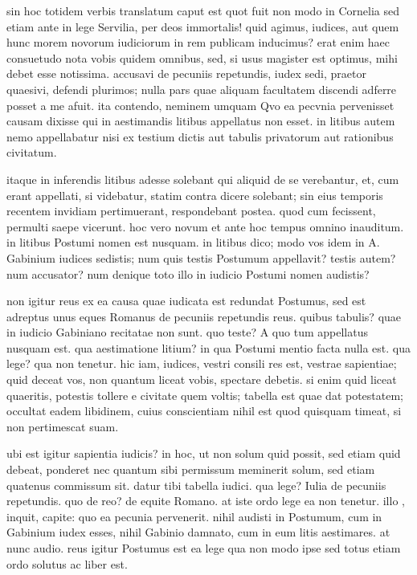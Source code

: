  sin hoc totidem verbis translatum caput est quot fuit non modo in Cornelia sed etiam ante in lege Servilia, per deos immortalis! quid agimus, iudices, aut quem hunc morem novorum iudiciorum in rem publicam inducimus? erat enim haec consuetudo nota vobis quidem omnibus, sed, si usus magister est optimus, mihi debet esse notissima. accusavi de pecuniis repetundis, iudex sedi, praetor quaesivi, defendi plurimos; nulla pars quae aliquam facultatem discendi adferre posset a me afuit. ita contendo, neminem umquam Qvo ea pecvnia pervenisset causam dixisse qui in aestimandis litibus appellatus non esset. in litibus autem nemo appellabatur nisi ex testium dictis aut tabulis privatorum aut rationibus civitatum.

 itaque in inferendis litibus adesse solebant qui aliquid de se verebantur, et, cum erant appellati, si videbatur, statim contra dicere solebant; sin eius temporis recentem invidiam pertimuerant, respondebant postea. quod cum fecissent, permulti saepe vicerunt. hoc vero novum et ante hoc tempus omnino inauditum. in litibus Postumi nomen est nusquam. in litibus dico; modo vos idem in A. Gabinium iudices sedistis; num quis testis Postumum appellavit? testis autem? num accusator? num denique toto illo in iudicio Postumi nomen audistis?

 non igitur reus ex ea causa quae iudicata est redundat Postumus, sed est adreptus unus eques Romanus de pecuniis repetundis reus. quibus tabulis? quae in iudicio Gabiniano recitatae non sunt. quo teste? A quo tum appellatus nusquam est. qua aestimatione litium? in qua Postumi mentio facta nulla est. qua lege? qua non tenetur. hic iam, iudices, vestri consili res est, vestrae sapientiae; quid deceat vos, non quantum liceat vobis, spectare debetis. si enim quid liceat quaeritis, potestis tollere e civitate quem voltis; tabella est quae dat potestatem; occultat eadem libidinem, cuius conscientiam nihil est quod quisquam timeat, si non pertimescat suam.

 ubi est igitur sapientia iudicis? in hoc, ut non solum quid possit, sed etiam quid debeat, ponderet nec quantum sibi permissum meminerit solum, sed etiam quatenus commissum sit. datur tibi tabella iudici. qua lege? Iulia de pecuniis repetundis. quo de reo? de equite Romano. at iste ordo lege ea non tenetur. illo , inquit, capite: quo ea pecunia pervenerit. nihil audisti in Postumum, cum in Gabinium iudex esses, nihil Gabinio damnato, cum in eum litis aestimares. at nunc audio. reus igitur Postumus est ea lege qua non modo ipse sed totus etiam ordo solutus ac liber est.

